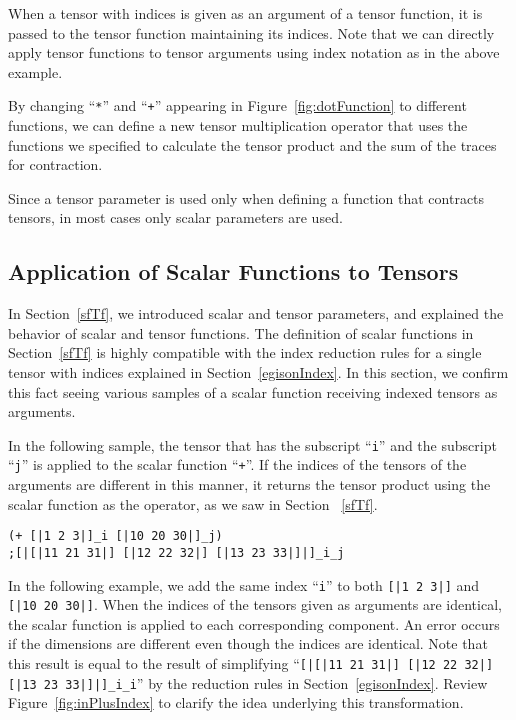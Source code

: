 \documentclass[acmlarge]{acmart}
\begin{document}
When a tensor with indices is given as an argument of a tensor function, it is passed to the tensor function maintaining its indices.
Note that we can directly apply tensor functions to tensor arguments using index notation as in the above example.

By changing ``\texttt{*}'' and ``\texttt{+}'' appearing in Figure~\ref{fig:dotFunction} to different functions, we can define a new tensor multiplication operator that uses the functions we specified to calculate the tensor product and the sum of the traces for contraction.
  
Since a tensor parameter is used only when defining a function that contracts tensors, in most cases only scalar parameters are used.

\subsection{Application of Scalar Functions to Tensors}\label{egisonOp}

In Section~\ref{sfTf}, we introduced scalar and tensor parameters, and explained the behavior of scalar and tensor functions.
The definition of scalar functions in Section~\ref{sfTf} is highly compatible with the index reduction rules for a single tensor with indices explained in Section~\ref{egisonIndex}.
In this section, we confirm this fact seeing various samples of a scalar function receiving indexed tensors as arguments.

In the following sample, the tensor that has the subscript ``\texttt{i}'' and the subscript ``\texttt{j}'' is applied to the scalar function ``\texttt{+}''.
If the indices of the tensors of the arguments are different in this manner, it returns the tensor product using the scalar function as the operator, as we saw in Section ~\ref{sfTf}.

{\footnotesize
\begin{verbatim}
(+ [|1 2 3|]_i [|10 20 30|]_j)
;[|[|11 21 31|] [|12 22 32|] [|13 23 33|]|]_i_j
\end{verbatim}
}

In the following example, we add the same index ``\texttt{i}'' to both \texttt{[|1 2 3|]} and \texttt{[|10 20 30|]}.
When the indices of the tensors given as arguments are identical, the scalar function is applied to each corresponding component.
An error occurs if the dimensions are different even though the indices are identical.
Note that this result is equal to the result of simplifying ``\verb![|[|11 21 31|] [|12 22 32|] [|13 23 33|]|]_i_i!'' by the reduction rules in Section~\ref{egisonIndex}.
Review Figure~\ref{fig:inPlusIndex} to clarify the idea underlying this transformation.
\end{document}
